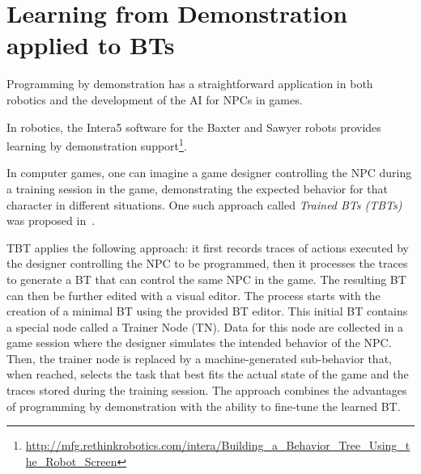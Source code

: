 %
%



\section{Learning from Demonstration applied to BTs}
\label{sec.dem}
Programming by demonstration  has a straightforward application in 
both robotics and 
the development of the AI for NPCs in games.

In robotics, the Intera5 software for the Baxter and Sawyer robots provides learning by demonstration support\footnote{\url{http://mfg.rethinkrobotics.com/intera/Building_a_Behavior_Tree_Using_the_Robot_Screen}}.

In computer games, one can imagine a game designer controlling the NPC during a training session in the game,  demonstrating the expected behavior for that character in different situations.
One such approach called \emph{Trained BTs (TBTs)} was  proposed in~\cite{olivenza2017trained}.

TBT applies the following approach:  
it first records traces of actions executed by the designer controlling the NPC to be programmed, then it processes the traces to generate a BT that can 
control the same NPC in the  game. The resulting BT can then be further edited with a  visual editor. 
The process starts with the creation of a minimal BT
using the provided BT editor. This initial BT contains a
special node called a Trainer Node (TN). Data for this node are
collected  in a game session where the designer simulates the intended behavior of the NPC. 
Then, the trainer node is
replaced by a machine-generated sub-behavior that, when
reached, selects the task that best fits the actual state of
the game and the traces stored  during the training session. 
The approach combines the advantages of programming
by demonstration with the ability to fine-tune the learned
BT.

